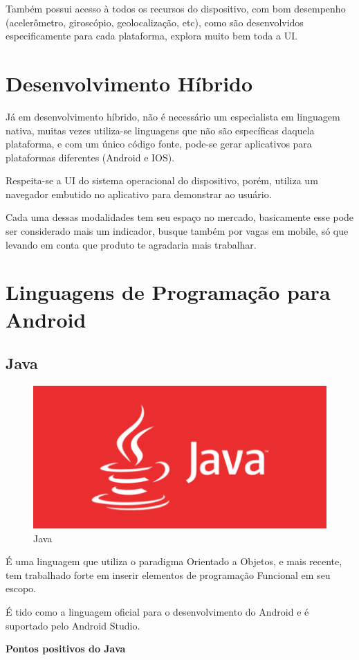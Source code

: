 Também possui acesso à todos os recursos do dispositivo, com bom desempenho (acelerômetro, giroscópio, geolocalização, etc), como são desenvolvidos especificamente para cada plataforma, explora muito bem toda a UI.

\section{Desenvolvimento Híbrido}

Já em desenvolvimento híbrido, não é necessário um especialista em linguagem nativa, muitas vezes utiliza-se linguagens que não são específicas daquela plataforma, e com um único código fonte, pode-se gerar aplicativos para plataformas diferentes (Android e IOS).

Respeita-se a UI do sistema operacional do dispositivo, porém, utiliza um navegador embutido no aplicativo para demonstrar ao usuário.

Cada uma dessas modalidades tem seu espaço no mercado, basicamente esse pode ser considerado mais um indicador, busque também por vagas em mobile, só que levando em conta que produto te agradaria mais trabalhar.

\section{Linguagens de Programação para Android}

\subsection{Java}

\begin{figure}[H]
    \centering
    \includegraphics[width=0.3\linewidth]{dados/figuras/java}
    \caption{Java}
    \label{fig:java}
\end{figure}

É uma linguagem que utiliza o paradigma Orientado a Objetos, e mais recente, tem trabalhado forte em inserir elementos de programação Funcional em seu escopo.

É tido como a linguagem oficial para o desenvolvimento do Android e é suportado pelo Android Studio.

\textbf{Pontos positivos do Java}

